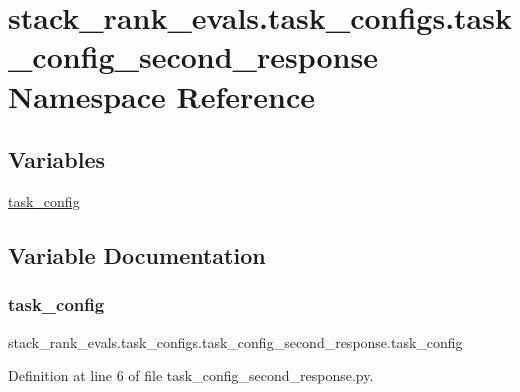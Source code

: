 \hypertarget{namespacestack__rank__evals_1_1task__configs_1_1task__config__second__response}{}\section{stack\+\_\+rank\+\_\+evals.\+task\+\_\+configs.\+task\+\_\+config\+\_\+second\+\_\+response Namespace Reference}
\label{namespacestack__rank__evals_1_1task__configs_1_1task__config__second__response}
\subsection*{Variables}
\begin{DoxyCompactItemize}
\item 
\hyperlink{namespacestack__rank__evals_1_1task__configs_1_1task__config__second__response_a1a1af9d6bbc0fb52d4addc23e6ea9a62}{task\+\_\+config}
\end{DoxyCompactItemize}


\subsection{Variable Documentation}
\mbox{\label{namespacestack__rank__evals_1_1task__configs_1_1task__config__second__response_a1a1af9d6bbc0fb52d4addc23e6ea9a62}} 
\subsubsection{\texorpdfstring{task\+\_\+config}{task\_config}}
{\footnotesize\ttfamily stack\+\_\+rank\+\_\+evals.\+task\+\_\+configs.\+task\+\_\+config\+\_\+second\+\_\+response.\+task\+\_\+config}



Definition at line 6 of file task\+\_\+config\+\_\+second\+\_\+response.\+py.

